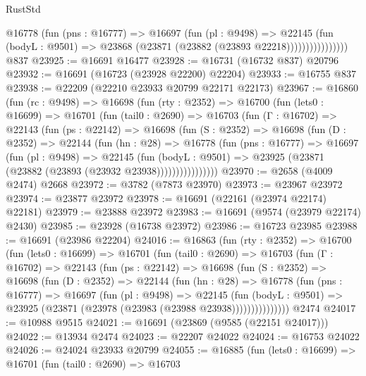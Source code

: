 \begin{lexlean}{RustStd}
\begin{coremodule}
                      @16778
                        (fun (pns : @16777) =>
                        @16697
                          (fun (pl : @9498) =>
                          @22145
                            (fun (bodyL : @9501) =>
                            @23868 (@23871 (@23882 (@23893 @22218))))))))))))))))
    @837
@23925 := @16691 @16477
@23928 := @16731 (@16732 @837) @20796
@23932 := @16691 (@16723 (@23928 @22200) @22204)
@23933 := @16755 @837
@23938 := @22209 (@22210 @23933 @20799 @22171 @22173)
@23967 := @16860
    (fun (rc : @9498) =>
    @16698
      (fun (rty : @2352) =>
      @16700
        (fun (lets0 : @16699) =>
        @16701
          (fun (tail0 : @2690) =>
          @16703
            (fun (Γ : @16702) =>
            @22143
              (fun (ps : @22142) =>
              @16698
                (fun (S : @2352) =>
                @16698
                  (fun (D : @2352) =>
                  @22144
                    (fun (hn : @28) =>
                    @16778
                      (fun (pns : @16777) =>
                      @16697
                        (fun (pl : @9498) =>
                        @22145
                          (fun (bodyL : @9501) =>
                          @23925 (@23871 (@23882 (@23893 (@23932 @23938))))))))))))))))
@23970 := @2658 (@4009 @2474) @2668
@23972 := @3782 (@7873 @23970)
@23973 := @23967 @23972
@23974 := @23877 @23972
@23978 := @16691 (@22161 (@23974 @22174) @22181)
@23979 := @23888 @23972
@23983 := @16691 (@9574 (@23979 @22174) @2430)
@23985 := @23928 (@16738 @23972)
@23986 := @16723 @23985
@23988 := @16691 (@23986 @22204)
@24016 := @16863
    (fun (rty : @2352) =>
    @16700
      (fun (lets0 : @16699) =>
      @16701
        (fun (tail0 : @2690) =>
        @16703
          (fun (Γ : @16702) =>
          @22143
            (fun (ps : @22142) =>
            @16698
              (fun (S : @2352) =>
              @16698
                (fun (D : @2352) =>
                @22144
                  (fun (hn : @28) =>
                  @16778
                    (fun (pns : @16777) =>
                    @16697
                      (fun (pl : @9498) =>
                      @22145
                        (fun (bodyL : @9501) =>
                        @23925 (@23871 (@23978 (@23983 (@23988 @23938)))))))))))))))
    @2474
@24017 := @10988 @9515
@24021 := @16691 (@23869 (@9585 (@22151 @24017)))
@24022 := @13934 @2474
@24023 := @22207 @24022
@24024 := @16753 @24022
@24026 := @24024 @23933 @20799
@24055 := @16885
    (fun (lets0 : @16699) =>
    @16701
      (fun (tail0 : @2690) =>
      @16703

\end{coremodule}
\end{lexlean}

